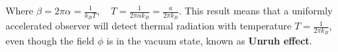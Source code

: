 \documentclass[12pt]{article}
\numberwithin{equation}{section}
\theoremstyle{1style}
\newcommand{\tbf}[1]{\textbf{#1}}
\newcommand{\id}{\mathrm{d}}
\begin{document}
Where \(\beta=2\pi\alpha=\frac{1}{k_BT},\quad T=\frac{1}{2\pi\alpha k_B}=\frac{a}{2\pi k_B}\).
This result means that a uniformly accelerated observer will detect thermal radiation with temperature \(T=\frac{1}{2\pi k_B}\),
even though the field \(\phi\) is in the vacuum state, known as \tbf{Unruh effect}.












\begin{comment}
\newpage
----------------------------

Not finished

For an inertial detector in n-dimensional Minkowski spacetime, only the last term of xxx contributes to the detector response function:
\begin{equation}
  \frac{\mathcal{F}(E)}{T}=(2\pi)^{1-n}\int^{\infty}_{-\infty}\id (\Delta \tau)\;e^{-iE\Delta\tau}
  \int\frac{\id^{n-1}k}{2\omega}e^{i(\omega-\mathbf{k}\cdot\mathbf{v})\frac{\Delta\tau}{\sqrt{1-v^2}}}n_{\mathbf{k}}
\end{equation}
Where \(T\) is the duration of the detector switched on. If \(\mathbf{v}=0\) we can further perform the integration:
\begin{align}
  \frac{\mathcal{F}(E)}{T} & = (2\pi)^{1-n}\int^{\infty}_{-\infty}\id (\Delta \tau)\;e^{-i\Delta\tau E}
  \int\frac{\id^{n-1}k}{2\omega}e^{i\Delta\tau\frac{(\omega-\mathbf{k}\cdot\mathbf{v})}{\sqrt{1-v^2}}}n_{\mathbf{k}}                  \\
                           & = (2\pi)^{1-n}\int\frac{\id^{n-1}k}{2\omega}\int^{\infty}_{-\infty}\id (\Delta \tau)\;e^{-i\Delta\tau E}
  e^{i\Delta\tau\frac{(\omega-\mathbf{k}\cdot\mathbf{v})}{\sqrt{1-v^2}}}n_{\mathbf{k}}                                                \\
                           & = (2\pi)^{1-n}\int\frac{\id^{n-1}k}{2\omega}\int^{\infty}_{-\infty}\id (\Delta \tau)\;
  e^{i\Delta\tau\frac{(\omega-\mathbf{k}\cdot\mathbf{v})}{\sqrt{1-v^2}}-i\Delta\tau E}n_{\mathbf{k}}                                  \\
                           & = (2\pi)^{1-n}\int\frac{\id^{n-1}k}{2\omega}\int^{\infty}_{-\infty}\id (\Delta \tau)\;
  e^{i\Delta\tau\left[\frac{(\omega-\mathbf{k}\cdot\mathbf{v})}{\sqrt{1-v^2}}-E\right]}n_{\mathbf{k}}                                 \\
                           & = (2\pi)^{1-n}(2\pi)\int\frac{\id^{n-1}k}{2\omega}\;

\end{comment}
\end{document}
